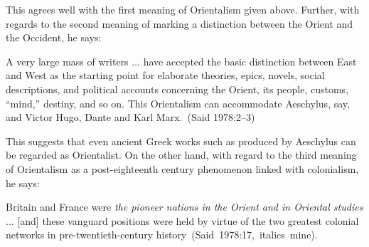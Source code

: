 This agrees well with the first meaning of Orientalism given above. Further, with regards to the second meaning of marking a distinction between the Orient and the Occident, he says:
\begin{myquote}
A very large mass of writers $\ldots$ have accepted the basic distinction between East and West as the starting point for elaborate theories, epics, novels, social descriptions, and political accounts concerning the Orient, its people, customs, “mind,” destiny, and so on. This Orientalism can accommodate Aeschylus, say, and Victor Hugo, Dante and Karl Marx.~\hfill(Said 1978:2--3)
\end{myquote}
\newpage

This suggests that even ancient Greek works such as produced by Aeschylus can be regarded as Orientalist. On the other hand, with regard to the third meaning of Orientalism as a post-eighteenth century phenomenon linked with colonialism, he says:
\begin{myquote}
Britain and France were {\sl the pioneer nations in the Orient and in Oriental studies} $\ldots$ [and] these vanguard positions were held by virtue of the two greatest colonial networks in pre-twentieth-century history~\hfill(Said~1978:17,~italics~mine).
\end{myquote}
\smallskip


